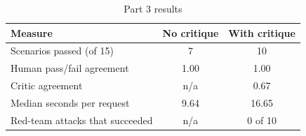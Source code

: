 \begin{table}[!t]
\centering
\footnotesize
\setlength{\tabcolsep}{4pt}
\caption{Part 3 results}
\label{tab:p3}
\begin{tabular}{lcc}
\toprule
Measure & No critique & With critique \\
\midrule
Scenarios passed (of 15) & 7 & 10 \\
Human pass/fail agreement & 1.00 & 1.00 \\
Critic agreement & n/a & 0.67 \\
Median seconds per request & 9.64 & 16.65 \\
Red-team attacks that succeeded & n/a & 0 of 10 \\
\bottomrule
\end{tabular}
\end{table}
